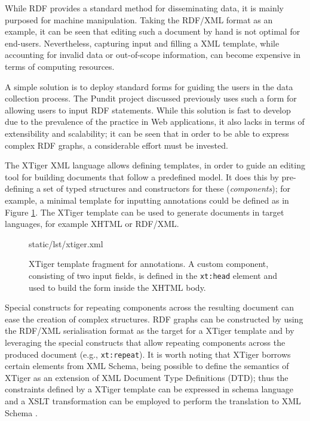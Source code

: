 While RDF provides a standard method for disseminating data, it is mainly
purposed for machine manipulation. Taking the RDF/XML format as an example, it
can be seen that editing such a document by hand is not optimal for end-users.
Nevertheless, capturing input and filling a XML template, while accounting
for invalid data or out-of-scope information, can become expensive in terms of
computing resources.

A simple solution is to deploy standard forms for guiding the users in the data
collection process. The Pundit project discussed previously uses such a form
for allowing users to input RDF statements. While this solution is fast to
develop due to the prevalence of the practice in Web applications, it also
lacks in terms of extensibility and scalability; it can be seen that in order
to be able to express complex RDF graphs, a considerable effort must be
invested.

The XTiger \cite{ref:xtiger} XML language allows defining templates, in order
to guide an editing tool for building documents that follow a predefined model.
It does this by pre-defining a set of typed structures and constructors for
these (\textit{components}); for example, a minimal template for inputting
annotations could be defined as in Figure \ref{lst:xtiger}. The XTiger template
can be used to generate documents in target languages, for example XHTML or
RDF/XML.

\begin{figure}[!ht]
  
    {static/lst/xtiger.xml}
  \caption[XTiger template fragment for annotations]
            {XTiger template fragment for annotations. A custom component,
             consisting of two input fields, is defined in the \texttt{xt:head}
             element and used to build the form inside the XHTML body.}
  \label{lst:xtiger}
\end{figure}

Special constructs for repeating components across the resulting document can
ease the creation of complex structures. RDF graphs can be constructed by using
the RDF/XML serialisation format as the target for a XTiger template and by
leveraging the special constructs that allow repeating components across the
produced document (e.g., \texttt{xt:repeat}). It is worth noting that XTiger
borrows certain elements from XML Schema, being possible to define the
semantics of XTiger as an extension of XML Document Type Definitions (DTD);
thus the constraints defined by a XTiger template can be expressed in schema
language and a XSLT transformation can be employed to perform the translation
to XML Schema \cite{ref:quint}.

